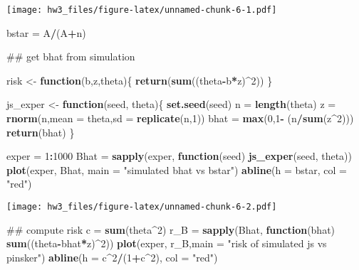 \documentclass[]{article}
\newenvironment{Shaded}{\begin{snugshade}}{\end{snugshade}}
\newcommand{\KeywordTok}[1]{\textcolor[rgb]{0.13,0.29,0.53}{\textbf{#1}}}
\newcommand{\DataTypeTok}[1]{\textcolor[rgb]{0.13,0.29,0.53}{#1}}
\newcommand{\DecValTok}[1]{\textcolor[rgb]{0.00,0.00,0.81}{#1}}
\newcommand{\StringTok}[1]{\textcolor[rgb]{0.31,0.60,0.02}{#1}}
\newcommand{\ControlFlowTok}[1]{\textcolor[rgb]{0.13,0.29,0.53}{\textbf{#1}}}
\newcommand{\OperatorTok}[1]{\textcolor[rgb]{0.81,0.36,0.00}{\textbf{#1}}}
\newcommand{\NormalTok}[1]{#1}
\begin{document}
\texttt{[image: hw3\_files/figure-latex/unnamed-chunk-6-1.pdf]}

\begin{Shaded}
\begin{Highlighting}[]
\NormalTok{bstar =}\StringTok{ }\NormalTok{A}\OperatorTok{/}\NormalTok{(A}\OperatorTok{+}\NormalTok{n)}

\NormalTok{## get bhat from simulation}

\NormalTok{risk <-}\StringTok{ }\ControlFlowTok{function}\NormalTok{(b,z,theta)\{}
  \KeywordTok{return}\NormalTok{(}\KeywordTok{sum}\NormalTok{((theta}\OperatorTok{-}\NormalTok{b}\OperatorTok{*}\NormalTok{z)}\OperatorTok{^}\DecValTok{2}\NormalTok{))}
\NormalTok{\}}

\NormalTok{js_exper <-}\StringTok{ }\ControlFlowTok{function}\NormalTok{(seed, theta)\{}
  \KeywordTok{set.seed}\NormalTok{(seed)}
\NormalTok{  n =}\StringTok{ }\KeywordTok{length}\NormalTok{(theta)}
\NormalTok{  z =}\StringTok{ }\KeywordTok{rnorm}\NormalTok{(n,}\DataTypeTok{mean =}\NormalTok{ theta,}\DataTypeTok{sd =} \KeywordTok{replicate}\NormalTok{(n,}\DecValTok{1}\NormalTok{))}
\NormalTok{  bhat =}\StringTok{ }\KeywordTok{max}\NormalTok{(}\DecValTok{0}\NormalTok{,}\DecValTok{1}\OperatorTok{-}\StringTok{ }\NormalTok{(n}\OperatorTok{/}\KeywordTok{sum}\NormalTok{(z}\OperatorTok{^}\DecValTok{2}\NormalTok{)))}
  \KeywordTok{return}\NormalTok{(bhat)}
\NormalTok{\}}

\NormalTok{exper =}\StringTok{ }\DecValTok{1}\OperatorTok{:}\DecValTok{1000}
\NormalTok{Bhat =}\StringTok{ }\KeywordTok{sapply}\NormalTok{(exper, }\ControlFlowTok{function}\NormalTok{(seed) }\KeywordTok{js_exper}\NormalTok{(seed, theta))}
\KeywordTok{plot}\NormalTok{(exper, Bhat, }\DataTypeTok{main =} \StringTok{"simulated bhat vs bstar"}\NormalTok{)}
\KeywordTok{abline}\NormalTok{(}\DataTypeTok{h =}\NormalTok{ bstar, }\DataTypeTok{col =} \StringTok{"red"}\NormalTok{)}
\end{Highlighting}
\end{Shaded}

\texttt{[image: hw3\_files/figure-latex/unnamed-chunk-6-2.pdf]}

\begin{Shaded}
\begin{Highlighting}[]
\NormalTok{## compute risk}
\NormalTok{c =}\StringTok{ }\KeywordTok{sum}\NormalTok{(theta}\OperatorTok{^}\DecValTok{2}\NormalTok{)}
\NormalTok{r_B =}\StringTok{ }\KeywordTok{sapply}\NormalTok{(Bhat, }\ControlFlowTok{function}\NormalTok{(bhat) }\KeywordTok{sum}\NormalTok{((theta}\OperatorTok{-}\NormalTok{bhat}\OperatorTok{*}\NormalTok{z)}\OperatorTok{^}\DecValTok{2}\NormalTok{))}
\KeywordTok{plot}\NormalTok{(exper, r_B,}\DataTypeTok{main =} \StringTok{"risk of simulated js vs pinsker"}\NormalTok{)}
\KeywordTok{abline}\NormalTok{(}\DataTypeTok{h =}\NormalTok{ c}\OperatorTok{^}\DecValTok{2}\OperatorTok{/}\NormalTok{(}\DecValTok{1}\OperatorTok{+}\NormalTok{c}\OperatorTok{^}\DecValTok{2}\NormalTok{), }\DataTypeTok{col =} \StringTok{"red"}\NormalTok{)}
\end{Highlighting}
\end{Shaded}
\end{document}
